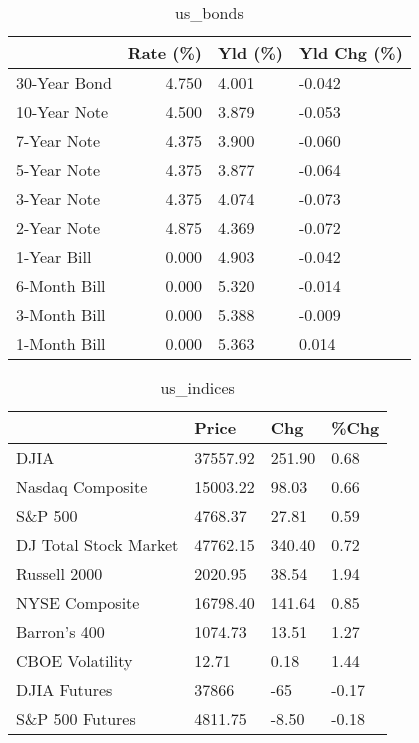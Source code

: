 \documentclass{article}%
\begin{document}
%


\begin{table}[htbp]%
\caption{us\_bonds}%
\centering%
\begin{adjustbox}{width=1\textwidth}%
\begin{tabular}{lrll}
\toprule
             &  Rate (\%) & Yld (\%) & Yld Chg (\%) \\
\midrule
30-Year Bond &     4.750 &   4.001 &      -0.042 \\
10-Year Note &     4.500 &   3.879 &      -0.053 \\
 7-Year Note &     4.375 &   3.900 &      -0.060 \\
 5-Year Note &     4.375 &   3.877 &      -0.064 \\
 3-Year Note &     4.375 &   4.074 &      -0.073 \\
 2-Year Note &     4.875 &   4.369 &      -0.072 \\
 1-Year Bill &     0.000 &   4.903 &      -0.042 \\
6-Month Bill &     0.000 &   5.320 &      -0.014 \\
3-Month Bill &     0.000 &   5.388 &      -0.009 \\
1-Month Bill &     0.000 &   5.363 &       0.014 \\
\bottomrule
\end{tabular}
%
\end{adjustbox}%
\end{table}

%


\begin{table}[htbp]%
\caption{us\_indices}%
\centering%
\begin{adjustbox}{width=1\textwidth}%
\begin{tabular}{llll}
\toprule
                      &    Price &    Chg &  \%Chg \\
\midrule
                 DJIA & 37557.92 & 251.90 &  0.68 \\
     Nasdaq Composite & 15003.22 &  98.03 &  0.66 \\
              S\&P 500 &  4768.37 &  27.81 &  0.59 \\
DJ Total Stock Market & 47762.15 & 340.40 &  0.72 \\
         Russell 2000 &  2020.95 &  38.54 &  1.94 \\
       NYSE Composite & 16798.40 & 141.64 &  0.85 \\
         Barron's 400 &  1074.73 &  13.51 &  1.27 \\
      CBOE Volatility &    12.71 &   0.18 &  1.44 \\
         DJIA Futures &    37866 &    -65 & -0.17 \\
      S\&P 500 Futures &  4811.75 &  -8.50 & -0.18 \\
\bottomrule
\end{tabular}
%
\end{adjustbox}%
\end{table}
\end{document}
